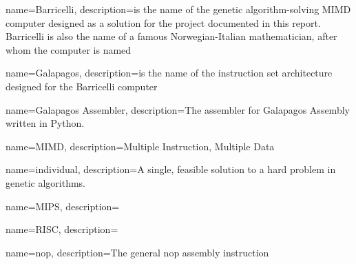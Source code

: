 {
name=Barricelli,
description={is the name of the genetic algorithm-solving MIMD computer designed as a solution for the project documented in this report. Barricelli is also the name of a famous Norwegian-Italian mathematician, after whom the computer is named}
}

{
name=Galapagos,
description={is the name of the instruction set architecture designed for the Barricelli computer}
}

{
name=Galapagos Assembler,
description={The assembler for Galapagos Assembly written in Python.}
}

{
name=MIMD,
description={Multiple Instruction, Multiple Data}
}

{
name=individual,
description={A single, feasible solution to a hard problem in genetic algorithms.}
}

{
name=MIPS,
description={}
}

{
name=RISC,
description={}
}

{
name=nop,
description={The general nop assembly instruction }
}
